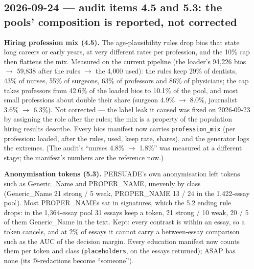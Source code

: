 \documentclass{article}
\begin{document}
\subsection*{2026-09-24 --- audit items 4.5 and 5.3: the pools' composition is reported, not corrected}
\textbf{Hiring profession mix (4.5).} The age-plausibility rules drop bios that state long careers or early years,
at very different rates per profession, and the 10\% cap then flattens the mix. Measured on the current pipeline
(the loader's 94{,}226 bios $\to$ 59{,}838 after the rules $\to$ the 4{,}000 used): the rules keep 29\% of dentists,
43\% of nurses, 55\% of surgeons, 63\% of professors and 86\% of physicians; the cap takes professors from 42.6\%
of the loaded bios to 10.1\% of the pool, and most small professions about double their share (surgeon 4.9\%
$\to$ 8.0\%, journalist 3.6\% $\to$ 6.3\%). Not corrected --- the label leak it caused was fixed on 2026-09-23 by
assigning the role after the rules; the mix is a property of the population hiring results describe. Every bios
manifest now carries \texttt{profession\_mix} (per profession: loaded, after the rules, used, keep rate, shares),
and the generator logs the extremes. (The audit's ``nurses 4.8\% $\to$ 1.8\%'' was measured at a different stage;
the manifest's numbers are the reference now.)

\textbf{Anonymisation tokens (5.3).} PERSUADE's own anonymisation left tokens such as Generic\_Name and PROPER\_NAME,
unevenly by class (Generic\_Name 21 strong / 5 weak, PROPER\_NAME 13 / 24 in the 1{,}422-essay pool). Most
PROPER\_NAMEs sat in signatures, which the 5.2 ending rule drops: in the 1{,}364-essay pool 31 essays keep a token,
21 strong / 10 weak, 20 / 5 of them Generic\_Name in the text. Kept: every contrast is within an essay, so a token
cancels, and at 2\% of essays it cannot carry a between-essay comparison such as the AUC of the decision margin.
Every education manifest now counts them per token and class (\texttt{placeholders}, on the essays returned); ASAP
has none (its @-redactions become ``someone'').
\end{document}
